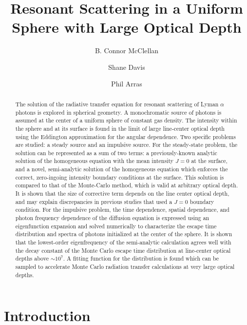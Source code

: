 \documentclass{aastex63}
\begin{document}
\title{Resonant Scattering in a Uniform Sphere with Large Optical Depth}




\author{B. Connor McClellan}
\author{Shane Davis}
\author{Phil Arras}


\begin{abstract}

The solution of the radiative transfer equation for resonant scattering of Lyman $\alpha$ photons is explored in spherical geometry. A monochromatic source of photons is assumed at the center of a uniform sphere of constant gas density. The intensity within the sphere and at its surface is found in the limit of large line-center optical depth using the Eddington approximation for the angular dependence. Two specific problems are studied: a steady source and an impulsive source. For the steady-state problem, the solution can be represented as a sum of two terms: a previously-known analytic solution of the homogeneous equation with the mean intensity $J=0$ at the surface, and a novel, semi-analytic solution of the homogeneous equation which enforces the correct, zero-ingoing intensity boundary conditions at the surface. This solution is compared to that of the Monte-Carlo method, which is valid at arbitrary optical depth. It is shown that the size of corrective term depends on the line center optical depth, and may explain discrepancies in previous studies that used a $J=0$ boundary condition. For the impulsive problem, the time dependence, spatial dependence, and photon frequency dependence of the diffusion equation is expressed using an eigenfunction expansion and solved numerically to characterize the escape time distribution and spectra of photons initialized at the center of the sphere. It is shown that the lowest-order eigenfrequency of the semi-analytic calculation agrees well with the decay constant of the Monte Carlo escape time distribution at line-center optical depths above ${\sim} 10^7$. A fitting function for the distribution is found which can be sampled to accelerate Monte Carlo radiation transfer calculations at very large optical depths.

\end{abstract}


\keywords{}

\section{Introduction}
\label{sec:intro}
\end{document}
